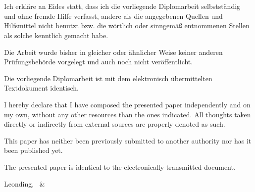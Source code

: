 \thispagestyle{empty}
\vspace{3cm}
~ \\ \\
{
Ich erkläre an Eides statt, dass ich die vorliegende Diplomarbeit selbstständig und ohne fremde Hilfe verfasst, andere als die angegebenen Quellen und Hilfsmittel nicht benutzt bzw. die wörtlich oder sinngemäß entnommenen Stellen als solche kenntlich gemacht habe.

Die Arbeit wurde bisher in gleicher oder ähnlicher Weise keiner anderen Prüfungsbehörde vorgelegt und auch noch nicht veröffentlicht.

Die vorliegende Diplomarbeit ist mit dem elektronisch übermittelten Textdokument identisch.
}
{
I hereby declare that I have composed the presented paper independently and on my own, without any other resources than the ones indicated. 
All thoughts taken directly or indirectly from external sources are properly denoted as such.

This paper has neither been previously submitted to another authority nor has it been published yet.

The presented paper is identical to the electronically transmitted document.
}
\vspace{3cm}
\begin{tabbing}
Leonding,  \hspace{2cm} \firstauthor\ \& \secondauthor %
\end{tabbing}
\vspace{10cm}
\newpage
\setcounter{page}{1}
